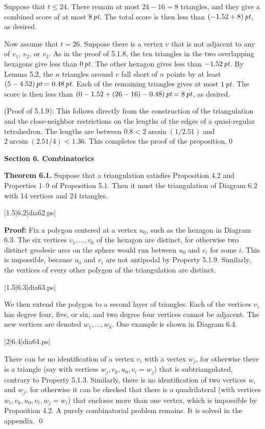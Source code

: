 Suppose that $t\le 24$.
There remain at most $24-16=8$ triangles,
and they give a combined score of at most $8\,\hbox{\it pt}$.  The total score
is then less than $(-1.52+8)\,\hbox{\it pt}$, as desired.

Now assume that $t=26$.
 Suppose there is a vertex $v$ that is not
adjacent to
any of $v_1$, $v_2$, or $v_3$. As in the proof of 5.1.8,
the ten triangles in the two overlapping hexagons
give less than $0\,\hbox{\it pt}$.  The other hexagon gives less than $-1.52\,\hbox{\it pt}$.
By Lemma 5.2, the $n$ triangles around $v$ fall short of $n$ points
by at least $(5-4.52)\,\hbox{\it pt}=0.48\,\hbox{\it pt}$.
Each of the remaining
triangles gives at most $1\,\hbox{\it pt}$.  The score is then
less than $(0-1.52+(26-16)-0.48)\,\hbox{\it pt} = 8\,\hbox{\it pt}$, as desired.

(Proof of 5.1.9):  
This follows directly from the construction
of the triangulation and the close-neighbor
restrictions  
on the lengths of the
edges of a quasi-regular tetrahedron.
The lengths are between $0.8<2\arcsin(1/2.51)$ and $2\arcsin(2.51/4)<1.36$.
This completes the proof of
the proposition.\qed

\bigskip
\centerline{\bf Section 6. Combinatorics}
\bigskip
{\bf Theorem 6.1.}  Suppose that a triangulation satisfies Proposition 4.2
and Properties
1--9 of Proposition 5.1.
Then it must the 
triangulation of Diagram 6.2 with 14 vertices and 24 triangles.
\smallskip


\gram|1.5|6.2|dia62.ps|

{\bf Proof:}
Fix a polygon centered at a vertex $u_0$, such as the
hexagon  in Diagram 6.3.
The six vertices
$v_1,\ldots,v_6$ of the hexagon are distinct, for otherwise two
distinct geodesic arcs on the sphere would run between $u_0$ and
$v_i$ for some $i$.  This is impossible, because $u_0$ and $v_i$
are not antipodal by Property 5.1.9.  Similarly, the vertices of every
other polygon of the triangulation are distinct.


\smallskip
\gram|1.5|6.3|dia63.ps|
\smallskip

We then extend the polygon to a second layer of triangles.
Each of the vertices $v_i$ has degree four, five, or
six,
and two degree four vertices cannot be adjacent.
The new vertices are denoted $w_1,\ldots,w_k$.
One example is shown in Diagram 6.4.

\gram|2|6.4|dia64.ps| %

There can be no identification of a vertex $v_i$ with a vertex $w_j$,
for otherwise there is a triangle (say with vertices
$w_j,v_k,u_0,v_i=w_j$)
that is subtriangulated, contrary to Property 5.1.3.
Similarly, there
is no identification of two vertices $w_i$ and $w_j$, for otherwise
it can be checked that there is
a quadrilateral (with vertices $w_i,v_k,u_0,v_\ell,w_j=w_i$)
that encloses more than one vertex, which is impossible by Proposition
4.2.  A purely combinatorial problem remains.  It is solved
in the appendix. \qed

